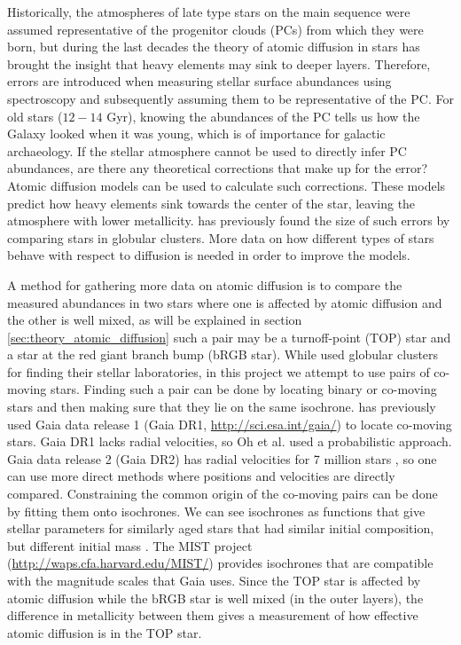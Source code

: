 \documentclass[twocolumn]{aastex62}
\begin{document}
Historically, the atmospheres of late type stars on the main sequence were assumed representative of the progenitor clouds (PCs) from which they were born, but during the last decades the theory of atomic diffusion in stars has brought the insight that heavy elements may sink to deeper layers. Therefore, errors are introduced when measuring stellar surface abundances using spectroscopy and subsequently assuming them to be representative of the PC. For old stars ($12-14$ Gyr), knowing the abundances of the PC tells us how the Galaxy looked when it was young, which is of importance for galactic archaeology. If the stellar atmosphere cannot be used to directly infer PC abundances, are there any theoretical corrections that make up for the error? Atomic diffusion models can be used to calculate such corrections. These models predict how heavy elements sink towards the center of the star, leaving the atmosphere with lower metallicity. \cite{Korn} has previously found the size of such errors by comparing stars in globular clusters. More data on how different types of stars behave with respect to diffusion is needed in order to improve the models.

A method for gathering more data on atomic diffusion is to compare the measured abundances in two stars where one is affected by atomic diffusion and the other is well mixed, as will be explained in section \ref{sec:theory_atomic_diffusion} such a pair may be a turnoff-point (TOP) star and a star at the red giant branch bump (bRGB star). While \cite{Korn} used globular clusters for finding their stellar laboratories, in this project we attempt to use pairs of co-moving stars. Finding such a pair can be done by locating binary or co-moving stars and then making sure that they lie on the same isochrone. \cite{Oh} has previously used Gaia data release 1 (Gaia DR1, \url{http://sci.esa.int/gaia/}) to locate co-moving stars. Gaia DR1 lacks radial velocities, so Oh et al. used a probabilistic approach. Gaia data release 2 (Gaia DR2) has radial velocities for 7 million stars \citep{GaiaDR2}, so one can use more direct methods where positions and velocities are directly compared. Constraining the common origin of the co-moving pairs can be done by fitting them onto isochrones. We can see isochrones as functions that give stellar parameters for similarly aged stars that had similar initial composition, but different initial mass \citep{Dotter}. The MIST project (\url{http://waps.cfa.harvard.edu/MIST/}) provides isochrones that are compatible with the magnitude scales that Gaia uses. Since the TOP star is affected by atomic diffusion while the bRGB star is well mixed (in the outer layers), the difference in metallicity between them gives a measurement of how effective atomic diffusion is in the TOP star.
\end{document}
